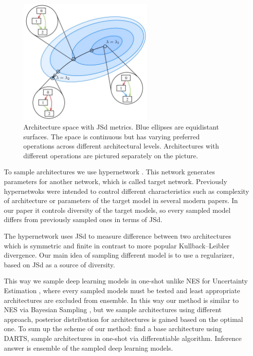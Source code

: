 \documentclass{article}
\begin{document}
\begin{figure}[h]
    \centering
    \includegraphics[width=0.6\textwidth]{fig1}
    \caption{\label{fig:arch}Architecture space with JSd metrics.
    Blue ellipses are equidistant surfaces.
	The space is continuous but has varying preferred operations across different architectural levels.
	Architectures with different operations are pictured separately on the picture.}
\end{figure}

To sample architectures we use hypernetwork \citep{hypernetworks}. This network generates parameters for another network, which is called target network.
Previously hypernetwoks were intended to control different characteristics such as
complexity of architecture \citep{darts-cc} or parameters of the target model \citep{cont-learn} in several modern papers. In our paper it controls 
diversity of the target models, so every sampled model differs from previously sampled ones in terms of JSd.

The hypernetwork uses JSd to measure difference between two architectures which is symmetric and finite
in contrast to more popular Kullback–Leibler divergence. Our main idea of sampling different model is to use a regularizer,
based on JSd as a source of diversity.

This way we sample deep learning models in one-shot unlike NES
for Uncertainty Estimation \citep{nes}, where every sampled models must be tested and least appropriate architectures are excluded from ensemble.
In this way our method is similar to NES via Bayesian Sampling \citep{baysiannes}, but we sample architectures using different approach, posterior distribution for architectures is gained based on the optimal one.
To sum up the scheme of our method: find a base architecture using DARTS, sample architectures in one-shot via differentiable algorithm. Inference answer is ensemble of the sampled deep learning models.
\end{document}
